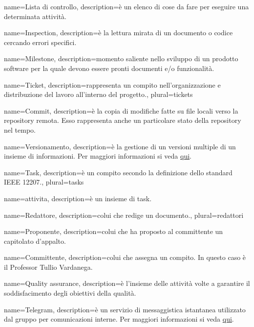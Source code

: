  {
	name=Lista di controllo,
	description={è un elenco di cose da fare per eseguire una determinata attività.}
}

 {
	name=Inspection,
	description={è la lettura mirata di un documento o codice cercando errori specifici.}
}

 {
	name=Milestone,
	description={momento saliente nello sviluppo di un prodotto software per la quale devono essere pronti documenti e/o funzionalità.}
}

 {
	name=Ticket,
	description={rappresenta un compito nell'organizzazione e distribuzione del lavoro all'interno del progetto.},
	plural=tickets
}

 {
	name=Commit,
	description={è la copia di modifiche fatte su file locali verso la repository remota. Esso rappresenta anche un particolare stato della repository nel tempo.}
}

 {
	name=Versionamento,
	description={è la gestione di un versioni multiple di un insieme di informazioni. Per maggiori informazioni si veda \href{http://it. wikipedia.org/wiki/Controllo_versione}{qui}.}
}

 {
	name=Task,
	description={è un compito secondo la definizione dello standard IEEE 12207.},
	plural=tasks
}

 {
	name=attivita,
	description={è un insieme di task.}
}

 {
	name=Redattore,
	description={colui che redige un documento.},
	plural=redattori
}

 {
	name=Proponente,
	description={colui che ha proposto al committente un capitolato d'appalto.}
}

 {
	name=Committente,
	description={colui che assegna un compito. In questo caso è il Professor Tullio Vardanega.}
}

 {
	name=Quality assurance,
	description={è l'insieme delle attività volte a garantire il soddisfacimento degli obiettivi della qualità.}
}

 {
	name=Telegram,
	description={è un servizio di messaggistica istantanea utilizzato dal gruppo per comunicazioni interne. Per maggiori informazioni si veda \href{https://it.wikipedia.org/wiki/Telegram_(software)}{qui}.}
}

